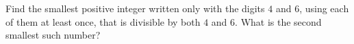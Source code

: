Find the smallest positive integer written only with the digits $4$ and $6$, using each of them at least once, that is divisible by both $4$ and $6$. What is the second smallest such number?
